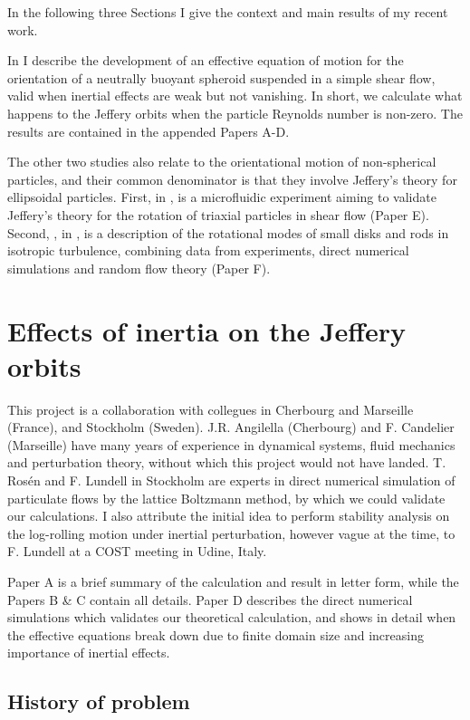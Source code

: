 \documentclass[thesis.tex]{subfiles}
\begin{document}
In the following three Sections I give the context and main results of my recent work. 

In  I describe the development of an effective equation of motion for the orientation of a neutrally buoyant spheroid suspended in a simple shear flow, valid when inertial effects are weak but not vanishing. In short, we calculate what happens to the Jeffery orbits when the particle Reynolds number is non-zero. The results are contained in the appended Papers A-D.

The other two studies also relate to the orientational motion of non-spherical particles, and their common denominator is that they involve Jeffery's theory for ellipsoidal particles.
First, in , is a microfluidic experiment aiming to validate Jeffery's theory for the rotation of triaxial particles in shear flow (Paper E). Second,
, in , is a description of the rotational modes of small disks and rods in isotropic turbulence, combining data from experiments, direct numerical simulations and random flow theory (Paper F).

\chapter[Effects of inertia]{Effects of inertia on the Jeffery orbits}\label{sec:effective}

This project is a collaboration with collegues in Cherbourg and Marseille (France), and Stockholm (Sweden). J.R. Angilella (Cherbourg) and F. Candelier (Marseille) have many years of experience in dynamical systems, fluid mechanics and perturbation theory, without which this project would not have landed. T. Ros\'en and F. Lundell in Stockholm are experts in direct numerical simulation of particulate flows by the lattice Boltzmann method, by which we could validate our calculations. I also attribute the initial idea to perform stability analysis on the log-rolling motion under inertial perturbation, however vague at the time, to F. Lundell at a COST meeting in Udine, Italy. 

Paper A is a brief summary of the calculation and result in letter form, while the Papers B \& C contain all details. Paper D describes the direct numerical simulations which validates our theoretical calculation, and shows in detail when the effective equations break down due to finite domain size and increasing importance of inertial effects.

\section{History of problem}
\end{document}

